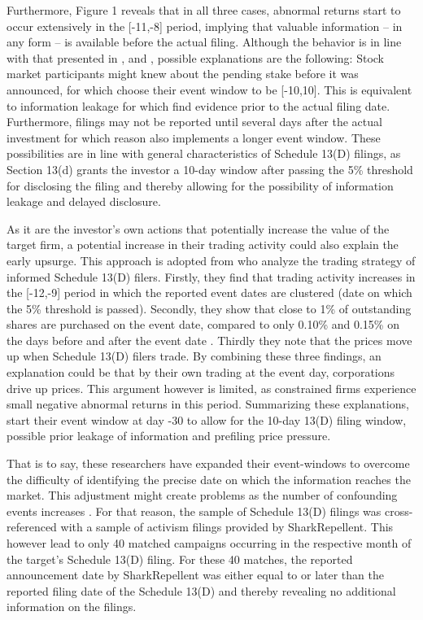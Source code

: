 \documentclass[12pt]{article}
\begin{document}
Furthermore, Figure 1 reveals that in all three cases, abnormal returns start to occur extensively in the [-11,-8] period, implying that valuable information -- in any form -- is available before the actual filing. Although the behavior is in line with that presented in \citet[p.1563]{Collin-Dufresne2015}, \citet[p.370]{Greenwood2009} and \citet[p.1756]{Brav2008}, possible explanations are the following: Stock market participants might knew about the pending stake before it was announced, for which \citet[p.2802]{Allen2000} choose their event window to be [-10,10]. This is equivalent to information leakage for which \citet[p.31]{Brigida2012} find evidence prior to the actual filing date. Furthermore, filings may not be reported until several days after the actual investment for which reason \citet[p.87]{Liao2014} also implements a longer event window. These possibilities are in line with general characteristics of Schedule 13(D) filings, as Section 13(d) grants the investor a 10-day window after passing the 5\% threshold for disclosing the filing and thereby allowing for the possibility of information leakage and delayed disclosure.\par
As it are the investor's own actions that potentially increase the value of the target firm, a potential increase in their trading activity could also explain the early upsurge. This approach is adopted from  \citet[p.1561]{Collin-Dufresne2015} who analyze the trading strategy of informed Schedule 13(D) filers. Firstly, they find that trading activity increases in the [-12,-9] period in which the reported event dates are clustered (date on which the 5\% threshold is passed). Secondly, they show that close to 1\% of outstanding shares are purchased on the event date, compared to only 0.10\% and 0.15\% on the days before and after the event date \citep[p.1561]{Collin-Dufresne2015}. Thirdly they note that the prices move up when Schedule 13(D) filers trade. By combining these three findings, an explanation could be that by their own trading at the event day, corporations drive up prices. This argument however is limited, as constrained firms experience small negative abnormal returns in this period. Summarizing these explanations, \citet[p.207]{Klein2009} start their event window at day -30 to allow for the 10-day 13(D) filing window, possible prior leakage of information and prefiling price pressure.\par
That is to say, these researchers have expanded their event-windows to overcome the difficulty of identifying the precise date on which the information reaches the market. This adjustment might create problems as the number of confounding events increases \citep[p.352]{mcwilliams1999}. For that reason, the sample of Schedule 13(D) filings was cross-referenced with a sample of activism filings provided by SharkRepellent. This however lead to only 40 matched campaigns occurring in the respective month of the target's Schedule 13(D) filing. For these 40 matches, the reported announcement date by SharkRepellent was either equal to or later than the reported filing date of the Schedule 13(D) and thereby revealing no additional information on the filings.
\end{document}
